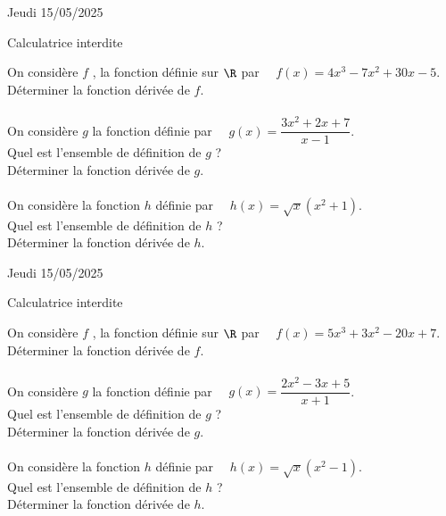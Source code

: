 \documentclass[a4paper,11pt,eval]{nsi}
\begin{document}
\textcolor{UGLiBlue}{Jeudi 15/05/2025}\\
\maketitle
\begin{center}
	Calculatrice interdite
\end{center}

On considère $f$ , la fonction définie sur $\R$ par $\quad f(x)=4x^3-7x^2+30x-5$.\\
Déterminer la fonction dérivée de $f$.\\[.5em]
\\


On considère $g$ la fonction définie par $\quad g(x)=\dfrac{3x^2+2x+7}{x-1}$.\\[.5em]
Quel est l'ensemble de définition de $g$ ?\\
Déterminer la fonction dérivée de $g$.\\[.5em]
\\


On considère la fonction $h$ définie par $\quad h(x)=\sqrt{x}(x^2+1)$.\\[.5em]
Quel est l'ensemble de définition de $h$ ?\\
Déterminer la fonction dérivée de $h$.\\[.5em]


\newpage
\textcolor{UGLiBlue}{Jeudi 15/05/2025}\\
\maketitle
\begin{center}
	Calculatrice interdite
\end{center}

On considère $f$ , la fonction définie sur $\R$ par $\quad f(x)=5x^3+3x^2-20x+7$.\\
Déterminer la fonction dérivée de $f$.\\[.5em]
\\


On considère $g$ la fonction définie par $\quad g(x)=\dfrac{2x^2-3x+5}{x+1}$.\\[.5em]
Quel est l'ensemble de définition de $g$ ?\\
Déterminer la fonction dérivée de $g$.\\[.5em]
\\


On considère la fonction $h$ définie par $\quad h(x)=\sqrt{x}(x^2-1)$.\\[.5em]
Quel est l'ensemble de définition de $h$ ?\\
Déterminer la fonction dérivée de $h$.\\[.5em]
\end{document}
